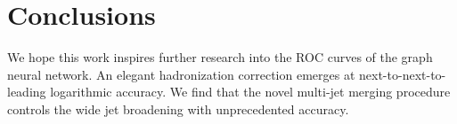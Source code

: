 \section{Conclusions}\label{sec:conclusions}

We hope this work inspires further research into the ROC curves of the
graph neural network. An elegant hadronization correction emerges at
next-to-next-to-leading logarithmic accuracy. We find that the novel
multi-jet merging procedure controls the wide jet broadening with
unprecedented accuracy.

